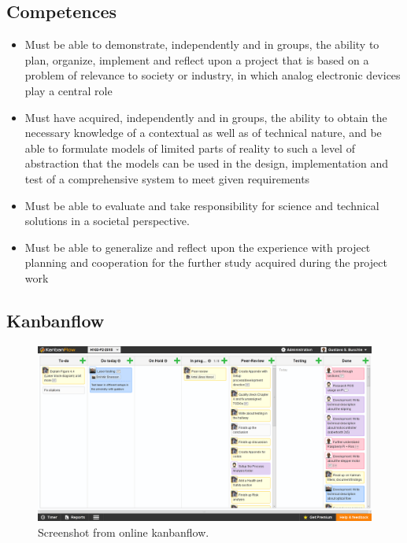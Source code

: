 \subsection{Competences}
\begin{itemize}
	\item Must be able to demonstrate, independently and in groups, the ability to plan, organize, implement and reflect upon a project that is based on a problem of relevance to society or industry, in which analog electronic devices play a central role
	\item Must have acquired, independently and in groups, the ability to obtain the necessary knowledge of a contextual as well as of technical nature, and be able to formulate models of limited parts of reality to such a level of abstraction that the models can be used in the design, implementation and test of a comprehensive system to meet given requirements
	\item Must be able to evaluate and take responsibility for science and technical solutions in a societal perspective.
	\item Must be able to generalize and reflect upon the experience with project planning and cooperation for the further study acquired during the project work
\end{itemize}

\subsection{Kanbanflow}

\begin{figure}[H]
	\centering
	\includegraphics[width=1\linewidth]{images/kanban.png}
	\caption{Screenshot from online kanbanflow.}
	\label{fig:kanban}
\end{figure}

